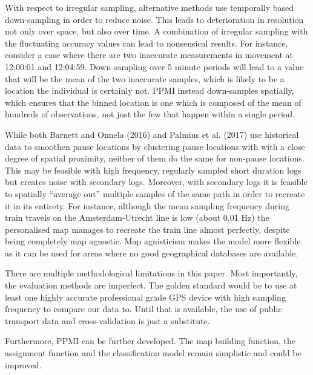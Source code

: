 \documentclass[man]{apa6}
\theoremstyle{definition}
\theoremstyle{definition}
\theoremstyle{definition}
\theoremstyle{remark}
\begin{document}
With respect to irregular sampling, alternative methods use temporally
based down-sampling in order to reduce noise. This leads to
deterioration in resolution not only over space, but also over time. A
combination of irregular sampling with the fluctuating accuracy values
can lead to nonsensical results. For instance, consider a case where
there are two inaccurate measurements in movement at 12:00:01 and
12:04:59. Down-sampling over 5 minute periods will lead to a value that
will be the mean of the two inaccurate samples, which is likely to be a
location the individual is certainly not. PPMI instead down-samples
spatially, which ensures that the binned location is one which is
composed of the mean of hundreds of observations, not just the few that
happen within a single period.

While both Barnett and Onnela (2016) and Palmius et al. (2017) use
historical data to smoothen pause locations by clustering pause
locations with with a close degree of spatial proximity, neither of them
do the same for non-pause locations. This may be feasible with high
frequency, regularly sampled short duration logs but creates noise with
secondary logs. Moreover, with secondary logs it is feasible to
spatially \enquote{average out} multiple samples of the same path in
order to recreate it in its entirety. For instance, although the mean
sampling frequency during train travels on the Amsterdam-Utrecht line is
low (about 0.01 Hz) the personalised map manages to recreate the train
line almost perfectly, despite being completely map agnostic. Map
agnisticism makes the model more flexible as it can be used for areas
where no good geographical databases are available.

There are multiple methodological limitations in this paper. Most
importantly, the evaluation methods are imperfect. The golden standard
would be to use at least one highly accurate professional grade GPS
device with high sampling frequency to compare our data to. Until that
is available, the use of public transport data and cross-validation is
just a substitute.

Furthermore, PPMI can be further developed. The map building function,
the assignment function and the classification model remain simplistic
and could be improved.
\end{document}
